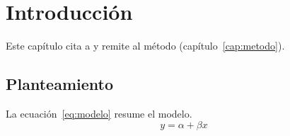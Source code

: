 \chapter{Introducción}
\label{cap:intro}
Este capítulo cita a \textcite{knuth1984} y remite al método (capítulo~\ref{cap:metodo}).

\section{Planteamiento}
\label{sec:planteamiento}
La ecuación~\eqref{eq:modelo} resume el modelo.
\begin{equation}
  y = \alpha + \beta x
  \label{eq:modelo}
\end{equation}
